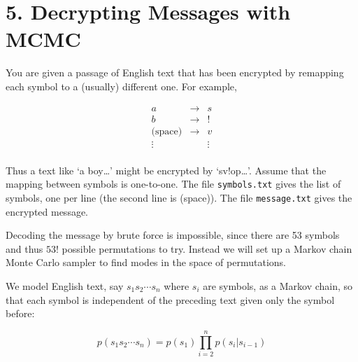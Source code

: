 \documentclass{article}
\begin{document}
\section*{5. Decrypting Messages with MCMC}

You are given a passage of English text that has been encrypted by remapping each symbol to a (usually) different one. For example,

\[
\begin{array}{ccc}
a & \rightarrow & s \\
b & \rightarrow & ! \\
\text{(space)} & \rightarrow & v \\
\vdots & & \vdots \\
\end{array}
\]

\noindent Thus a text like ‘a boy…’ might be encrypted by ‘sv!op…’. Assume that the mapping between symbols is one-to-one. The file \texttt{symbols.txt} gives the list of symbols, one per line (the second line is (space)). The file \texttt{message.txt} gives the encrypted message.
\vspace{0.5em}

\noindent Decoding the message by brute force is impossible, since there are 53 symbols and thus \( 53! \) possible permutations to try. Instead we will set up a Markov chain Monte Carlo sampler to find modes in the space of permutations.
\vspace{0.5em}

\noindent We model English text, say \( s_1 s_2 \cdots s_n \) where \( s_i \) are symbols, as a Markov chain, so that each symbol is independent of the preceding text given only the symbol before:

\[
p(s_1 s_2 \cdots s_n) = p(s_1) \prod_{i=2}^{n} p(s_i | s_{i-1})
\]
\end{document}
